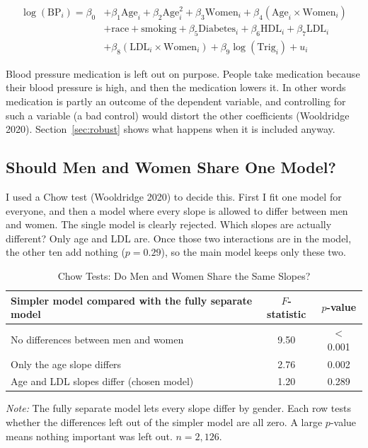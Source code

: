 \documentclass[preprint,letterpaper,11pt,authoryear]{elsarticle}
\newenvironment{tablenotes}{\par\vspace{3pt}\begin{minipage}{0.95\linewidth}\footnotesize\textit{Note:} }{\end{minipage}}
\begin{document}
\begin{align}
\log(\text{BP}_i) = \beta_0 &+ \beta_1 \text{Age}_i + \beta_2 \text{Age}_i^2 + \beta_3 \text{Women}_i + \beta_4 (\text{Age}_i \times \text{Women}_i) \nonumber \\
&+ \text{race} + \text{smoking} + \beta_5 \text{Diabetes}_i + \beta_6 \text{HDL}_i + \beta_7 \text{LDL}_i \nonumber \\
&+ \beta_8 (\text{LDL}_i \times \text{Women}_i) + \beta_9 \log(\text{Trig}_i) + u_i
\end{align}

Blood pressure medication is left out on purpose. People take medication because their blood pressure is high, and then the medication lowers it. In other words medication is partly an outcome of the dependent variable, and controlling for such a variable (a bad control) would distort the other coefficients (Wooldridge 2020). Section~\ref{sec:robust} shows what happens when it is included anyway.

\subsection{Should Men and Women Share One Model?}
I used a Chow test (Wooldridge 2020) to decide this. First I fit one model for everyone, and then a model where every slope is allowed to differ between men and women. The single model is clearly rejected. Which slopes are actually different? Only age and LDL are. Once those two interactions are in the model, the other ten add nothing ($p = 0.29$), so the main model keeps only these two.

\begin{table}[!htbp]
\centering\small\setlength{\tabcolsep}{4pt}
\caption{Chow Tests: Do Men and Women Share the Same Slopes?}
\begin{tabular}{lcc}
\toprule
Simpler model compared with the fully separate model & $F$-statistic & $p$-value \\
\midrule
No differences between men and women & 9.50 & $<$ 0.001 \\
Only the age slope differs & 2.76 & 0.002 \\
Age and LDL slopes differ (chosen model) & 1.20 & 0.289 \\
\bottomrule
\end{tabular}
\begin{tablenotes}
The fully separate model lets every slope differ by gender. Each row tests whether the differences left out of the simpler model are all zero. A large $p$-value means nothing important was left out. $n = 2{,}126$.
\end{tablenotes}
\end{table}
\end{document}
